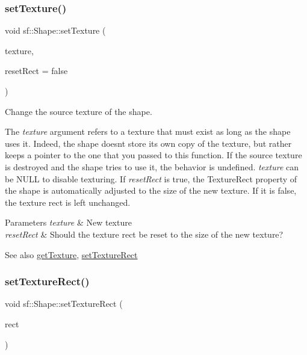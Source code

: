 \subsubsection{\texorpdfstring{setTexture()}{setTexture()}}
{\footnotesize\ttfamily void sf\+::\+Shape\+::set\+Texture (\begin{DoxyParamCaption}\item[{const \mbox{\hyperlink{classsf_1_1_texture}{Texture}} $\ast$}]{texture,  }\item[{bool}]{reset\+Rect = {\ttfamily false} }\end{DoxyParamCaption})}



Change the source texture of the shape. 

The {\itshape texture} argument refers to a texture that must exist as long as the shape uses it. Indeed, the shape doesn\textquotesingle{}t store its own copy of the texture, but rather keeps a pointer to the one that you passed to this function. If the source texture is destroyed and the shape tries to use it, the behavior is undefined. {\itshape texture} can be N\+U\+LL to disable texturing. If {\itshape reset\+Rect} is true, the Texture\+Rect property of the shape is automatically adjusted to the size of the new texture. If it is false, the texture rect is left unchanged.


\begin{DoxyParams}{Parameters}
{\em texture} & New texture \\
\hline
{\em reset\+Rect} & Should the texture rect be reset to the size of the new texture?\\
\hline
\end{DoxyParams}
\begin{DoxySeeAlso}{See also}
\mbox{\hyperlink{classsf_1_1_shape_a06682d37fd38d8fad56afdd5228b6951}{get\+Texture}}, \mbox{\hyperlink{classsf_1_1_shape_a2029cc820d1740d14ac794b82525e157}{set\+Texture\+Rect}} \begin{DoxyVerb}\end{DoxyVerb}
 
\end{DoxySeeAlso}
\mbox{\label{classsf_1_1_shape_a2029cc820d1740d14ac794b82525e157}} 
\subsubsection{\texorpdfstring{setTextureRect()}{setTextureRect()}}
{\footnotesize\ttfamily void sf\+::\+Shape\+::set\+Texture\+Rect (\begin{DoxyParamCaption}\item[{const \mbox{\hyperlink{classsf_1_1_rect}{Int\+Rect}} \&}]{rect }\end{DoxyParamCaption})}



